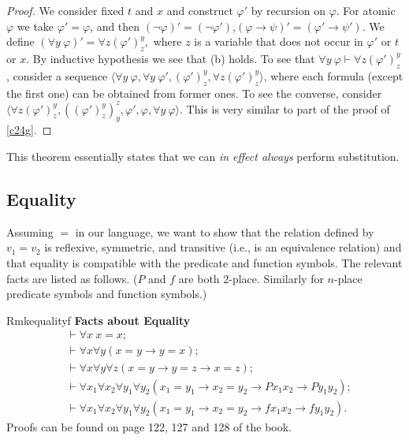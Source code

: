 \begin{proof}
  We consider fixed $t$ and $x$ and construct $\varphi'$ by recursion on $\varphi$. For atomic $\varphi$ we take $\varphi'=\varphi$, and then $(\neg \varphi)'=(\neg \varphi')$,$(\varphi\rightarrow \psi)'=(\varphi'\rightarrow \psi')$. We define $(\forall y\ \varphi)'=\forall z(\varphi')_z^y,$ where $z$ is a variable that does not occur in $\varphi'$ or $t$ or $x$. By inductive hypothesis we see that (b) holds. To see that $\forall y\ \varphi\vdash\forall z(\varphi')_z^y$, consider a sequence $\langle \forall y\ \varphi, \forall y\ \varphi', (\varphi')_z^y, \forall z(\varphi')_z^y\rangle$, where each formula (except the first one) can be obtained from former ones. To see the converse, consider $\langle\forall z(\varphi')_z^y, ((\varphi')_z^y)_y^z, \varphi',\varphi,\forall y\ \varphi\rangle$. This is very similar to part of the proof of \ref{c24g}.
\end{proof}

This theorem essentially states that we can \textit{in effect always} perform substitution.

\subsection*{Equality}

Assuming $=$ in our language, we want to show that the relation defined by $v_1=v_2$ is reflexive, symmetric, and transitive (i.e., is an equivalence relation) and that equality is compatible with the predicate and function symbols. The relevant facts are listed as follows. ($P$ and $f$ are both $2$-place. Similarly for $n$-place predicate symbols and function symbols.)

\begin{reference}{Rmk}{equalityf}
  \textbf{Facts about Equality}
  \begin{align*}
     & \vdash\forall x\ x=x;\tag{Eq.1}                                                                                                 \\
     & \vdash\forall x\forall y(x=y\rightarrow y=x);\tag{Eq.2}                                                                         \\
     & \vdash\forall x\forall y\forall z(x=y\rightarrow y=z\rightarrow x=z);\tag{Eq.3}                                                 \\
     & \vdash\forall x_1\forall x_2\forall y_1\forall y_2(x_1=y_1\rightarrow x_2=y_2\rightarrow Px_1x_2\rightarrow Py_1y_2);\tag{Eq.4} \\
     & \vdash\forall x_1\forall x_2\forall y_1\forall y_2(x_1=y_1\rightarrow x_2=y_2\rightarrow fx_1x_2\rightarrow fy_1y_2).\tag{Eq.5}
  \end{align*}
  Proofs can be found on page 122, 127 and 128 of the book.
\end{reference}

